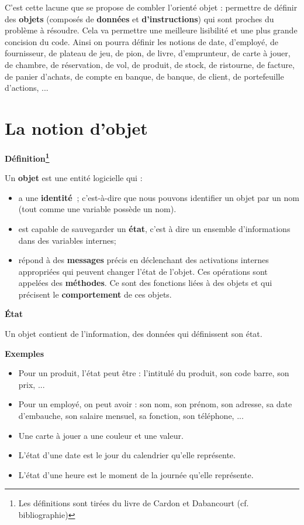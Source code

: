 	C'est cette lacune que se propose de combler
	l'orienté objet : permettre de définir des
	\textbf{objets} (composés de \textbf{données} et
	\textbf{d'instructions}) qui sont proches du problème
	à résoudre. Cela va permettre une meilleure lisibilité et une plus
	grande concision du code. Ainsi on pourra définir les notions de date,
	d'employé, de fournisseur, de plateau de jeu, de pion,
	de livre, d'emprunteur, de carte à jouer, de chambre,
	de réservation, de vol, de produit, de stock, de ristourne, de facture,
	de panier d'achats, de compte en banque, de banque, de
	client, de portefeuille d'actions, ...


\section{La notion d'objet}

{\sffamily\bfseries\upshape
Définition\footnote{Les définitions sont tirées du livre de Cardon et
Dabancourt (cf. bibliographie)}}

Un \textbf{objet} est une entité logicielle qui :

\liststyleListi
\begin{itemize}
	\item 
		a une \textbf{identité~}; c'est-à-dire que nous pouvons
		identifier un objet par un nom (tout comme une variable possède un
		nom).
	\item 
		est capable de sauvegarder un \textbf{état}, c'est à
		dire un ensemble d'informations dans des variables
		internes;
	\item 
		répond à des \textbf{messages} précis en déclenchant des activations
		internes appropriées qui peuvent changer l'état de
		l'objet. Ces opérations sont appelées des
		\textbf{méthodes}. Ce sont des fonctions liées à des objets et qui
		précisent le \textbf{comportement} de ces objets.
\end{itemize}

{\sffamily\bfseries\upshape
État}

Un objet contient de l'information, des données qui
définissent son état.

{\bfseries
Exemples}

\liststyleListv
\begin{itemize}
	\item 
		Pour un produit, l'état peut être :
		l'intitulé du produit, son code barre, son prix, ... 
	\item 
		Pour un employé, on peut avoir : son nom, son prénom, son adresse, sa
		date d'embauche, son salaire mensuel, sa fonction, son
		téléphone, ... 
	\item 
		Une carte à jouer a une couleur et une valeur.
	\item 
		L'état d'une date est le jour du
		calendrier qu'elle représente.
	\item 
		L'état d'une heure est le moment de la
		journée qu'elle représente.
\end{itemize}

